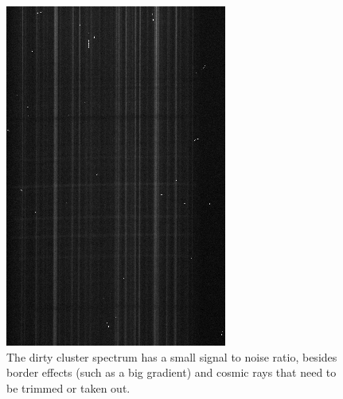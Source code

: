 \begin{figure}[]
  \centering
  \begin{minipage}[b]{0.49\textwidth}
    \includegraphics[width=\textwidth]{images/cluster_dirty.png}
    \caption[Dirty spectrum of NGC5139]{The dirty cluster spectrum has a small signal to noise ratio, besides border effects (such as a big gradient) and cosmic rays that need to be trimmed or taken out.}
  \end{minipage}
  \hfill
  \begin{minipage}[b]{0.49\textwidth}

\end{minipage}
\end{figure}
